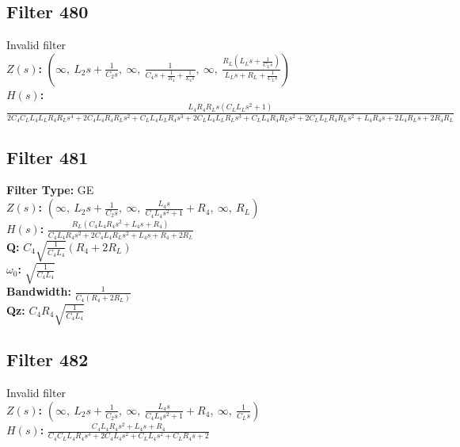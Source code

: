\documentclass{article}
\begin{document}
\subsection*{Filter 480}
Invalid filter \\ 
\textbf{$Z(s)$:} $\left( \infty, \  L_{2} s + \frac{1}{C_{2} s}, \  \infty, \  \frac{1}{C_{4} s + \frac{1}{R_{4}} + \frac{1}{L_{4} s}}, \  \infty, \  \frac{R_{L} \left(L_{L} s + \frac{1}{C_{L} s}\right)}{L_{L} s + R_{L} + \frac{1}{C_{L} s}}\right)$ \\ 
\textbf{$H(s)$:} $\frac{L_{4} R_{4} R_{L} s \left(C_{L} L_{L} s^{2} + 1\right)}{2 C_{4} C_{L} L_{4} L_{L} R_{4} R_{L} s^{4} + 2 C_{4} L_{4} R_{4} R_{L} s^{2} + C_{L} L_{4} L_{L} R_{4} s^{3} + 2 C_{L} L_{4} L_{L} R_{L} s^{3} + C_{L} L_{4} R_{4} R_{L} s^{2} + 2 C_{L} L_{L} R_{4} R_{L} s^{2} + L_{4} R_{4} s + 2 L_{4} R_{L} s + 2 R_{4} R_{L}}$ \\ 
\subsection*{Filter 481}
\textbf{Filter Type:} GE \\ 
\textbf{$Z(s)$:} $\left( \infty, \  L_{2} s + \frac{1}{C_{2} s}, \  \infty, \  \frac{L_{4} s}{C_{4} L_{4} s^{2} + 1} + R_{4}, \  \infty, \  R_{L}\right)$ \\ 
\textbf{$H(s)$:} $\frac{R_{L} \left(C_{4} L_{4} R_{4} s^{2} + L_{4} s + R_{4}\right)}{C_{4} L_{4} R_{4} s^{2} + 2 C_{4} L_{4} R_{L} s^{2} + L_{4} s + R_{4} + 2 R_{L}}$ \\ 
\textbf{Q:} $C_{4} \sqrt{\frac{1}{C_{4} L_{4}}} \left(R_{4} + 2 R_{L}\right)$ \\ 
\textbf{$\omega_0$:} $\sqrt{\frac{1}{C_{4} L_{4}}}$ \\ 
\textbf{Bandwidth:} $\frac{1}{C_{4} \left(R_{4} + 2 R_{L}\right)}$ \\ 
\textbf{Qz:} $C_{4} R_{4} \sqrt{\frac{1}{C_{4} L_{4}}}$ \\ 
\subsection*{Filter 482}
Invalid filter \\ 
\textbf{$Z(s)$:} $\left( \infty, \  L_{2} s + \frac{1}{C_{2} s}, \  \infty, \  \frac{L_{4} s}{C_{4} L_{4} s^{2} + 1} + R_{4}, \  \infty, \  \frac{1}{C_{L} s}\right)$ \\ 
\textbf{$H(s)$:} $\frac{C_{4} L_{4} R_{4} s^{2} + L_{4} s + R_{4}}{C_{4} C_{L} L_{4} R_{4} s^{3} + 2 C_{4} L_{4} s^{2} + C_{L} L_{4} s^{2} + C_{L} R_{4} s + 2}$ \\ 
\end{document}

